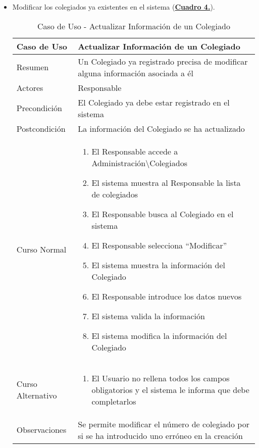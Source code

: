 \begin{itemize}
	\item \addtocounter{tabla}{1} Modificar los colegiados ya existentes en el sistema (\textbf{\hyperref[tab:curActualizarColeg]{Cuadro 4.}}).
		\begin{table}[!htbp]
		  \centering \addtocounter{casouso}{1}
		  \begin{tabular}{|l | p{100mm}|}
		    \textbf{Caso de Uso}  & \textbf{Actualizar Información de un Colegiado} \\ \hline
		    Resumen 		 & Un Colegiado ya registrado precisa de modificar alguna información asociada a él \\ \hline
		    Actores  		 & Responsable \\ \hline
		    Precondición  	 & El Colegiado ya debe estar registrado en el sistema  \\ \hline
		    Postcondición  	 & La información del Colegiado se ha actualizado \\ \hline
		    Curso Normal   	 & \begin{enumerate}
			  \item El Responsable accede a Administración\textbackslash Colegiados
			  \item El sistema muestra al Responsable la lista de colegiados
			  \item El Responsable busca al Colegiado en el sistema
			  \item El Responsable selecciona ``Modificar''
			  \item El sistema muestra la información del Colegiado
			  \item El Responsable introduce los datos nuevos
			  \item El sistema valida la información
			  \item El sistema modifica la información del Colegiado
		    \end{enumerate}  \\ \hline
		    Curso Alternativo  & \begin{enumerate}
			  \item El Usuario no rellena todos los campos obligatorios y el sistema le informa que debe completarlos
		    \end{enumerate}  \\ \hline
		    Observaciones 	 & Se permite modificar el número de colegiado por si se ha introducido uno erróneo en la creación  \\ \hline
		  \end{tabular}
		  \caption{Caso de Uso  - Actualizar Información de un Colegiado}
		  \label{tab:curActualizarColeg}
		\end{table}
		\FloatBarrier
\end{itemize}

